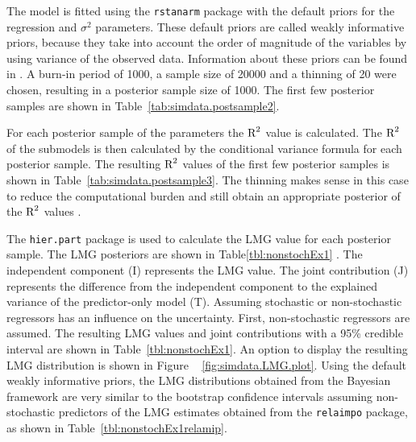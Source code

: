 \documentclass[11pt,a4paper,twoside]{book}\usepackage[]{graphicx}\usepackage[]{color}
\begin{document}
The model is fitted using the \texttt{rstanarm} package \citep{rstanarm} with the default priors for the regression and $\sigma^2$ parameters. These default priors are called weakly informative priors, because they take into account the order of magnitude of the variables by using variance of the observed data. Information about these priors can be found in \cite{stanM2017}. A burn-in period of 1000, a sample size of 20000 and a thinning of 20 were chosen, resulting in a posterior sample size of 1000. The first few posterior samples are shown in Table~\ref{tab:simdata.postsample2}. 

For each posterior sample of the parameters the $\text{R}^2$ value is calculated. The $\text{R}^2$ of the submodels is then calculated by the conditional variance formula for each posterior sample. The resulting $\text{R}^2$ values of the first few posterior samples is shown in Table~\ref{tab:simdata.postsample3}.  The thinning makes sense in this case to reduce the computational burden and still obtain an appropriate posterior of the $\text{R}^2$ values \citep{Link2012}. 

The \texttt{hier.part} package is used to calculate the LMG value for each posterior sample. The LMG posteriors are shown in Table\ref{tbl:nonstochEx1} . The independent component (I) represents the LMG value. The joint contribution (J) represents the difference from the independent component to the explained variance of the predictor-only model (T). Assuming stochastic or non-stochastic regressors has an influence on the uncertainty. First, non-stochastic regressors are assumed. The resulting LMG values and joint contributions with a 95\% credible interval are shown in Table~\ref{tbl:nonstochEx1}. An option to display the resulting LMG distribution is shown in Figure ~ \ref{fig:simdata.LMG.plot}.  Using the default weakly informative priors, the LMG distributions obtained from the Bayesian framework are very similar to the bootstrap confidence intervals assuming non-stochastic predictors of the LMG estimates obtained from the \texttt{relaimpo} package, as shown in Table~\ref{tbl:nonstochEx1relamip}. 
\end{document}
